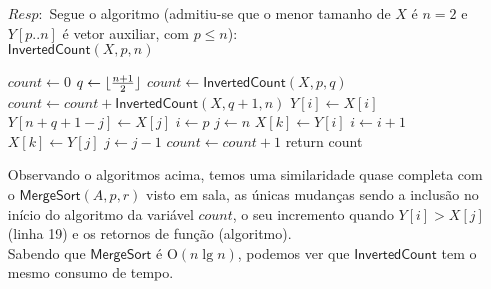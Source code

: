 \documentclass{homework}
\DeclarePairedDelimiter\floor{\lfloor}{\rfloor}
\begin{document}
	\begin{enumerate}
		\item[$Resp:$] Segue o algoritmo (admitiu-se que o menor tamanho de $X$ é $n = 2$ e $Y[p..n]$ é vetor auxiliar, com $p \leq n$):\\
			$\mathsf{InvertedCount}(X,p,n)$
			\begin{algorithmic}[1]
				\State $count\gets 0$
					\State $q\gets \floor{\frac{n+1}{2}}$
					\State $count\gets \mathsf{InvertedCount}(X,p,q)$
					\State $count\gets count + \mathsf{InvertedCount}(X,q+1,n)$
						\State $Y[i]\gets X[i]$
					\EndFor
						\State $Y[n+q+1-j]\gets X[j]$
					\EndFor
					\State $i\gets p$
					\State $j\gets n$
							\State $X[k]\gets Y[i]$
							\State $i\gets i + 1$
						\Else
							\State $X[k]\gets Y[j]$
							\State $j\gets j - 1$
							\State $count\gets count + 1$							
						\EndIf
					\EndFor			
				\EndIf
				\State return count
			\end{algorithmic}
		Observando o algoritmos acima, temos uma similaridade quase completa com o $\mathsf{MergeSort}(A,p,r)$ visto em sala, as únicas mudanças sendo a inclusão no início do algoritmo da variável $count$, o seu incremento quando $Y[i] > X[j]$ (linha 19) e os retornos de função (algoritmo).\\ 
		Sabendo que $\mathsf{MergeSort}$ é O$(n \lg n)$, podemos ver que $\mathsf{InvertedCount}$ tem o mesmo consumo de tempo.
	\end{enumerate}
\end{document}

